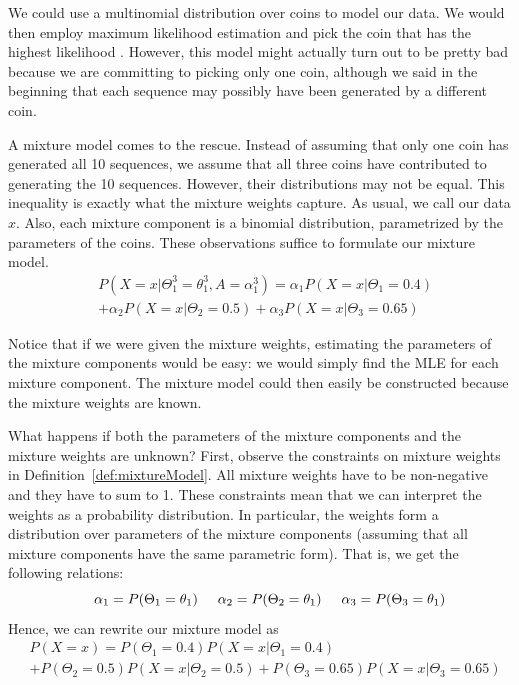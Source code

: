 We could use 
a multinomial distribution over coins to model our data. We would then employ maximum likelihood estimation 
and pick the coin that has the highest likelihood . However, this model might actually turn out to be
pretty bad because we are committing to picking only one coin, although we said in the beginning that
each sequence may possibly have been generated by a different coin. 

A mixture model comes to the rescue. Instead of assuming that only one coin has generated all 10 sequences,
we assume that all three coins have contributed to generating the 10 sequences. However, their distributions
may not be equal. This inequality is exactly what the mixture weights capture. As usual, we call our data $ x $. Also, each mixture component is a binomial distribution, parametrized by the parameters of
the coins. These observations suffice to formulate our mixture model.
\begin{align}\label{eq:mixtureExample}
&P(X=x|\Theta_{1}^{3}=\theta_{1}^{3}, A = \alpha_{1}^{3}) 
= \alpha_{1}P(X=x|\Theta_{1}=0.4) \\
&+ \alpha_{2}P(X=x|\Theta_{2}=0.5) + \alpha_{3}P(X=x|\Theta_{3}=0.65) \nonumber
\end{align}

Notice that if we were given the mixture weights, estimating
the parameters of the mixture components would be easy: we would simply find the MLE for each mixture component. The mixture
model could then easily be constructed because the mixture weights are known. 

What happens if both the parameters of the mixture components and the mixture weights are unknown? First, observe the constraints
on mixture weights in Definition~\ref{def:mixtureModel}. All mixture weights have to be non-negative and they have to sum to 1.
These constraints mean that we can interpret the weights as a probability distribution. In particular, the weights form a distribution over parameters
of the mixture components (assuming that all mixture components have the same parametric form). That is, we get the following
relations:
\begin{equation}
\hskip 0.5cm \alpha_{1} = P(\Theta_{1} = \theta_{1}) \hskip 0.5cm \alpha_{2} = P(\Theta_{2} = \theta_{1}) \hskip 0.5cm \alpha_{3} = P(\Theta_{3} = \theta_{1})
\end{equation}
Hence, we can rewrite our mixture model as
\begin{align} \label{eq:probabilisticMixtureModel}
&P(X=x) 
= P(\Theta_{1} = 0.4)P(X=x|\Theta_{1}=0.4) \\
&+ P(\Theta_{2} = 0.5)P(X=x|\Theta_{2}=0.5) + P(\Theta_{3} = 0.65)P(X=x|\Theta_{3}=0.65) \nonumber
\end{align}

